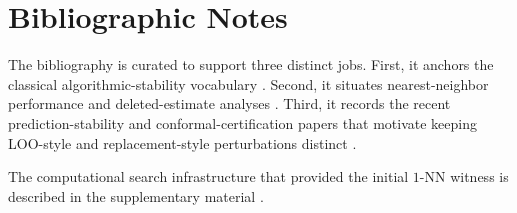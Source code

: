 \section{Bibliographic Notes}

The bibliography is curated to support three distinct jobs. First, it anchors
the classical algorithmic-stability vocabulary
\cite{bousquet2002stability,kutin2002almost,feldman2019high,bousquet2020sharpening}.
Second, it situates nearest-neighbor performance and deleted-estimate analyses
\cite{cover1967nearest,cover1968estimation,stone1977consistent,rogers1978finite,devroye1979distribution,devroye1979local}.
Third, it records the recent prediction-stability and conformal-certification
papers that motivate keeping LOO-style and replacement-style perturbations
distinct \cite{liang2023algorithmic,pournaderi2024training}.

The computational search infrastructure that provided the initial $1$-NN
witness is described in the supplementary material \cite{codex2025codex}.
